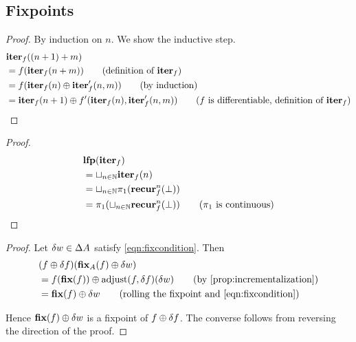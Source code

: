 \subsection{Fixpoints}

\iterDerivativesN*
\begin{proof}
  \label{prf:iterDerivativesN}
  By induction on $n$. We show the inductive step.
  \begin{align*}
    &\iter_f((n+1) + m)\\
    &=f(\iter_f(n + m)) \tag{definition of $\iter_f$}\\
    &=f(\iter_f(n) \cplus \derive{\iter_f}(n, m)) \tag{by induction}\\
    &=\iter_f(n+1) \cplus \derive{f}(\iter_f(n), \derive{\iter_f}(n, m)) \tag{$f$ is differentiable, definition of $\iter_f$}
  \end{align*}
\end{proof}

\fixpointIter*
\begin{proof}
  \label{prf:fixpointIter}
  \begin{align*}
    &\textbf{lfp}(\textbf{iter}_f)\\
    &=\sqcup_{n \in \mathbb{N}} \textbf{iter}_f(n)\\
    &=\sqcup_{n \in \mathbb{N}} \pi_1 (\textbf{recur}_f^n(\bot))\\
    &=\pi_1 (\sqcup_{n \in \mathbb{N}} \textbf{recur}_f^n(\bot)) \tag{$\pi_1$ is continuous}
  \end{align*}
\end{proof}

\fixpointPseudoDerivatives*
\begin{proof}
  \label{prf:fixpointPseudoDerivatives}
  Let $\delta w \in \Delta A$ satisfy \cref{eqn:fixcondition}. Then
  \begin{align*}
    &(f \cplus \change{f})(\fixpoint_A(f) \cplus \change{w})\\
    &= f(\fixpoint(f))
    \cplus
    \adjust(f, \change{f})(\change{w})
    \tag{by \cref{prop:incrementalization}}\\
    &= \fixpoint(f)
    \cplus
    \change{w}
    \tag{rolling the fixpoint and \cref{eqn:fixcondition}}
  \end{align*}

  Hence $\textbf{fix}(f) \oplus \delta w$ is a fixpoint of $f \oplus \delta f$. The converse
  follows from reversing the direction of the proof.
\end{proof}

